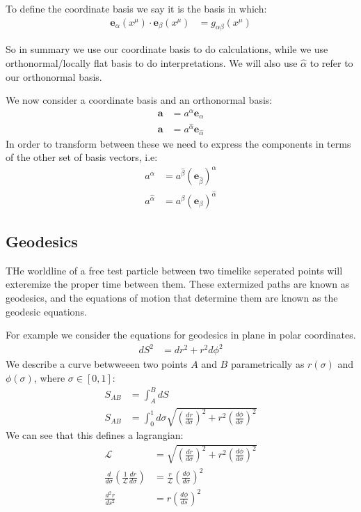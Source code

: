 To define the coordinate basis we say it is the basis in which:
\begin{align*}
	\bm{e}_\alpha(x^\mu)\cdot\bm{e}_\beta(x^\mu) &= g_{\alpha\beta}(x^\mu)
\end{align*}

So in summary we use our coordinate basis to do calculations, while we use orthonormal/locally flat basis to do interpretations. We will also use $\hat{\alpha}$ to refer to our orthonormal basis.

We now consider a coordinate basis and an orthonormal basis:
\begin{align*}
	\bm{a} &= a^\alpha\bm{e}_\alpha \\
	\bm{a} &= a^{\hat{\alpha}}\bm{e}_{\hat{\alpha}}
\end{align*}
In order to transform between these we need to express the components in terms of the other set of basis vectors, i.e:
\begin{align*}
	a^\alpha &= a^{\hat{\beta}}(\bm{e}_{\hat{\beta}})^\alpha \\
	a^{\hat{\alpha}} &= a^{\beta}(\bm{e}_{\beta})^{\hat{\alpha}}
\end{align*}
\subsection{Geodesics}
THe worldline of a free test particle between two timelike seperated points will exteremize the proper time between them. These extermized paths are known as geodesics, and the equations of motion that determine them are known as the geodesic equations.

For example we consider the equations for geodesics in plane in polar coordinates.
\begin{align*}
	dS^2 &= dr^2 + r^2 d\phi^2
\end{align*}
We describe a curve betwweeen two points $A$ and $B$ parametrically as $r(\sigma)$ and $\phi(\sigma)$, where $\sigma\in[0,1]$:
\begin{align*}
	S_{AB} &= \int_A^B dS \\
	S_{AB} &= \int_0^1 d\sigma \sqrt{\left(\frac{dr}{d\sigma}\right)^2 + r^2 \left(\frac{d\phi}{d\sigma}\right)^2}
\end{align*}
We can see that this defines a lagrangian:
\begin{align*}
	\mathcal{L}&= \sqrt{\left(\frac{dr}{d\sigma}\right)^2 + r^2 \left(\frac{d\phi}{d\sigma}\right)^2} \\
	\frac{d}{d\sigma} \left(\frac{1}{\mathcal{L}} \frac{dr}{d\sigma}\right) &= \frac{r}{\mathcal{L}} \left(\frac{d\phi}{d\sigma}\right)^2 \\
	\frac{d^2r}{ds^2} &= r\left(\frac{d\phi}{ds}\right)^2
\end{align*}

